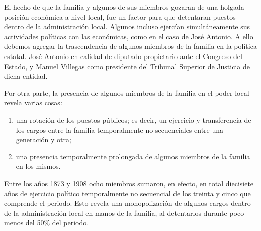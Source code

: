 \documentclass[14pt,twoside,final]{extbook} %
\begin{document}
El hecho de que la familia y algunos de sus miembros gozaran de una holgada posición económica a nivel local, fue un factor para que detentaran puestos dentro de la administración local. Algunos incluso ejercían simultáneamente sus actividades políticas con las económicas, como en el caso de José Antonio. A ello debemos agregar la trascendencia de algunos miembros de la familia en la política estatal. José Antonio en calidad de diputado propietario ante el Congreso del Estado, y Manuel Villegas como presidente del Tribunal Superior de Justicia de dicha entidad.

Por otra parte, la presencia de algunos miembros de la familia en el poder local revela varias cosas:
\begin{enumerate}[noitemsep]
\item una rotación de los puestos públicos; es decir, un ejercicio y transferencia de los cargos entre la familia temporalmente no secuenciales entre una generación y otra; 
\item una presencia temporalmente prolongada de algunos miembros de la familia en los mismos.
\end{enumerate}
Entre los años 1873 y 1908 ocho miembros sumaron, en efecto, en total diecisiete años de ejercicio político temporalmente no secuencial de los treinta y cinco que comprende el periodo. Esto revela una monopolización de algunos cargos dentro de la administración local en manos de la familia, al detentarlos durante poco menos del 50\% del periodo.
\end{document}
